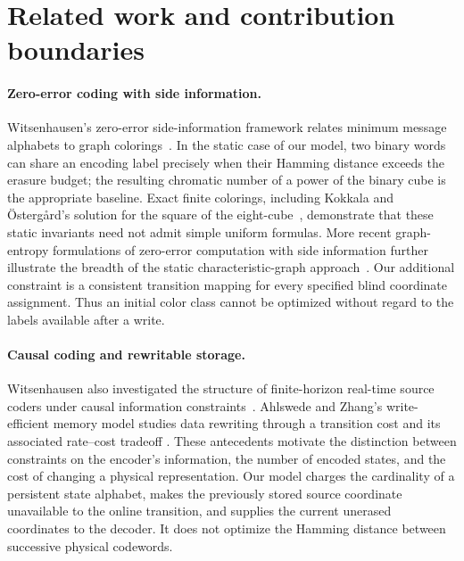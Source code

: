 \section{Related work and contribution boundaries}\label{sec:related-work-expanded}

\paragraph{Zero-error coding with side information.}
Witsenhausen's zero-error side-information framework relates minimum
message alphabets to graph colorings~\cite{witsenhausen1976}. In the static
case of our model, two binary words can share an encoding label precisely
when their Hamming distance exceeds the erasure budget; the resulting
chromatic number of a power of the binary cube is the appropriate baseline.
Exact finite colorings, including Kokkala and \"Osterg\r{a}rd's solution
for the square of the eight-cube~\cite{kokkala2017}, demonstrate that
these static invariants need not admit simple uniform formulas. More
recent graph-entropy formulations of zero-error computation with
side information further illustrate the breadth of the static
characteristic-graph approach~\cite{charpenay2024}. Our additional
constraint is a consistent transition mapping for every specified blind
coordinate assignment. Thus an initial color class cannot be optimized
without regard to the labels available after a write.

\paragraph{Causal coding and rewritable storage.}
Witsenhausen also investigated the structure of finite-horizon real-time
source coders under causal information constraints~\cite{witsenhausen1979}.
Ahlswede and Zhang's write-efficient memory model studies data rewriting
through a transition cost and its associated rate--cost tradeoff
\cite{ahlswedezhang1989}. These antecedents motivate the distinction
between constraints on the encoder's information, the number of encoded
states, and the cost of changing a physical representation. Our model
charges the cardinality of a persistent state alphabet, makes the
previously stored source coordinate unavailable to the online transition,
and supplies the current unerased coordinates to the decoder. It does not
optimize the Hamming distance between successive physical codewords.

